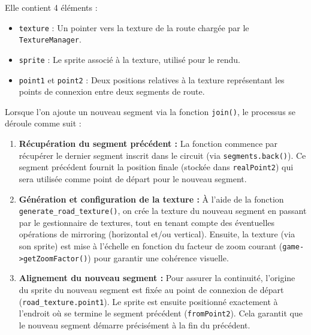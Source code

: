 Elle contient 4 éléments :
\begin{itemize}
    \item \texttt{texture} : Un \gls{pointer} vers la texture de la route chargée par le \texttt{TextureManager}.
    \item \texttt{\gls{sprite}} : Le \gls{sprite} associé à la texture, utilisé pour le rendu.
    \item \texttt{point1} et \texttt{point2} : Deux positions relatives à la texture représentant les points de connexion entre deux segments de route.
\end{itemize}

Lorsque l'on ajoute un nouveau segment via la fonction \texttt{join()}, le processus se déroule comme suit :

\begin{enumerate}
    \item \textbf{Récupération du segment précédent :}
    La fonction commence par récupérer le dernier segment inscrit dans le circuit (via \texttt{segments.back()}).
    Ce segment précédent fournit la position finale (stockée dans \texttt{realPoint2}) qui sera utilisée comme point de départ pour le nouveau segment.

    \item \textbf{Génération et configuration de la texture :}
    À l'aide de la fonction \\\texttt{generate\_road\_texture()}, on crée la texture du nouveau segment en passant par le gestionnaire de textures, tout en tenant compte des éventuelles opérations de mirroring (horizontal et/ou vertical).
    Ensuite, la texture (via son \gls{sprite}) est mise à l’échelle en fonction du facteur de zoom courant (\texttt{game->getZoomFactor()}) pour garantir une cohérence visuelle.

    \item \textbf{Alignement du nouveau segment :}
    Pour assurer la continuité, l'origine du \gls{sprite} du nouveau segment est fixée au point de connexion de départ (\texttt{road\_texture.point1}).
    Le \gls{sprite} est ensuite positionné exactement à l'endroit où se termine le segment précédent (\texttt{fromPoint2}).
    Cela garantit que le nouveau segment démarre précisément à la fin du précédent.


\end{enumerate}
